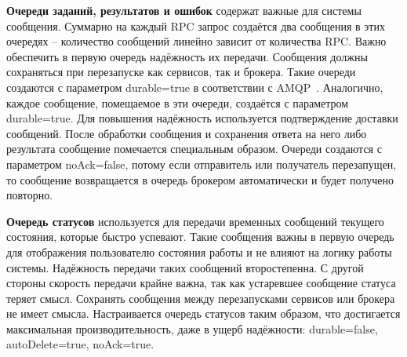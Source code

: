 \textbf{Очереди заданий, результатов и ошибок} содержат важные для системы
сообщения. Суммарно на каждый RPC запрос создаётся два сообщения
в этих очередях -- количество сообщений линейно зависит от количества RPC.
Важно обеспечить в первую очередь надёжность их передачи.
Сообщения должны сохраняться при перезапуске как сервисов, так и брокера.
Такие очереди создаются с параметром durable=true в соответствии
с AMQP~\cite{amqp}. Аналогично, каждое сообщение, помещаемое в эти очереди,
создаётся с параметром durable=true. Для повышения надёжность используется
подтверждение доставки сообщений. После обработки сообщения и сохранения
ответа на него либо результата сообщение помечается специальным образом.
Очереди создаются с параметром noAck=false, потому если отправитель
или получатель перезапущен, то сообщение возвращается в очередь
брокером автоматически и будет получено повторно.

\textbf{Очередь статусов} используется для передачи временных сообщений текущего
состояния, которые быстро успевают. Такие сообщения важны в первую очередь
для отображения пользователю состояния работы и не влияют на логику работы
системы. Надёжность передачи таких сообщений второстепенна. С другой стороны
скорость передачи крайне важна, так как устаревшее сообщение статуса
теряет смысл. Сохранять сообщения между перезапусками сервисов или брокера
не имеет смысла. Настраивается очередь статусов таким образом, что достигается
максимальная производительность, даже в ущерб надёжности: durable=false,
autoDelete=true, noAck=true.
